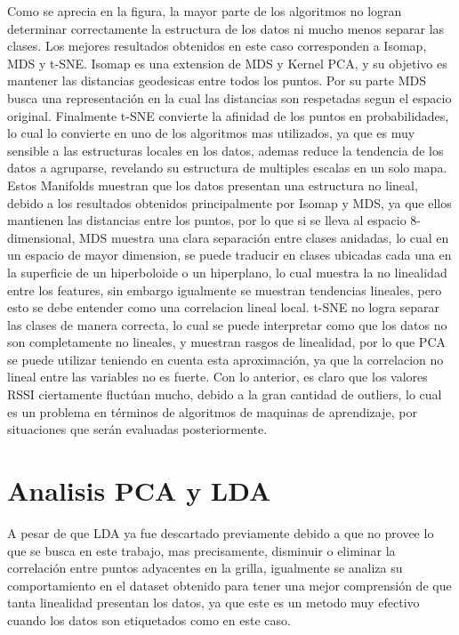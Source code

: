 Como se aprecia en la figura, la mayor parte de los algoritmos no logran determinar correctamente la estructura de los datos ni mucho menos separar las clases. Los mejores resultados obtenidos en este caso corresponden a Isomap, MDS y t-SNE. Isomap es una extension de MDS y Kernel PCA, y su objetivo es mantener las distancias geodesicas entre todos los puntos. Por su parte MDS busca una representación en la cual las distancias son respetadas segun el espacio original. Finalmente t-SNE convierte la afinidad de los puntos en probabilidades, lo cual lo convierte en uno de los algoritmos mas utilizados, ya que es muy sensible a las estructuras locales en los datos, ademas reduce la tendencia de los datos a agruparse, revelando su estructura de multiples escalas en un solo mapa. Estos Manifolds muestran que los datos presentan una estructura no lineal, debido a los resultados obtenidos principalmente por Isomap y MDS, ya que ellos mantienen  las distancias entre los puntos, por lo que si se lleva al espacio 8-dimensional, MDS muestra una clara separación entre clases anidadas, lo cual en un espacio de mayor dimension, se puede traducir en clases ubicadas cada una en la superficie de un hiperboloide o un hiperplano, lo cual muestra la no linealidad entre los features, sin embargo igualmente se muestran tendencias lineales, pero esto se debe entender como una correlacion lineal local. t-SNE no logra separar las clases de manera correcta, lo cual se puede interpretar como que los datos no son completamente no lineales, y muestran rasgos de linealidad, por lo que PCA se puede utilizar teniendo en cuenta esta aproximación, ya que la correlacion no lineal entre las variables no es fuerte. Con lo anterior, es claro que los valores RSSI ciertamente fluctúan mucho, debido a la gran cantidad de outliers, lo cual es un problema en términos de algoritmos de maquinas de aprendizaje, por situaciones que serán evaluadas posteriormente.


\section{Analisis PCA y LDA}

A pesar de que LDA ya fue descartado previamente debido a que no provee lo que se busca en este trabajo, mas precisamente, disminuir o eliminar la correlación entre puntos adyacentes en la grilla, igualmente se analiza su comportamiento en el dataset obtenido para tener una mejor comprensión de que tanta linealidad presentan los datos, ya que este es un metodo muy efectivo cuando los datos son etiquetados como en este caso. 

